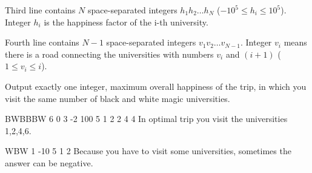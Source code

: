 Third line contains $N$ space-separated integers $h_1 h_2 \ldots h_N$ ($-10^5 \leq h_i \leq 10^5$).
Integer $h_i$ is the happiness factor of the i-th university.

Fourth line contains $N-1$ space-separated integers $v_1 v_2 \ldots v_{N-1}$.
Integer $v_i$ means there is a road connecting the universities with numbers $v_i$ and $(i+1)$ ($1 \leq v_i \leq i$).



Output exactly one integer, maximum overall happiness of the trip, in which
you visit the same number of black and white magic universities.



BWBBBW
6 0 3 -2 100 5
1 2 2 4 4
\sampleCOMMENT
In optimal trip you visit the universities 1,2,4,6.
\sampleEND

\bigskip

WBW
1 -10 5
1 2
\sampleCOMMENT
Because you have to visit some universities, sometimes the
answer can be negative.
\sampleEND


